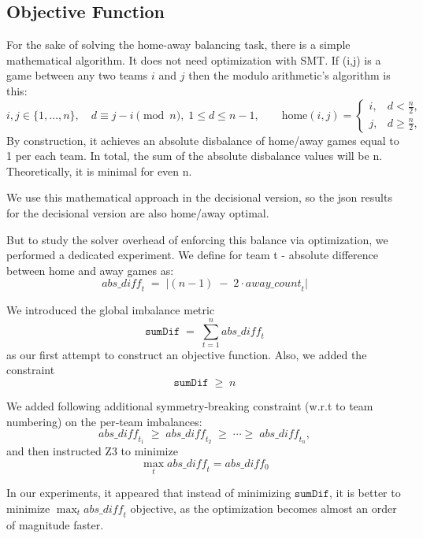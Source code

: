 

\subsection{Objective Function}

For the sake of solving the home-away balancing task, there is a simple mathematical algorithm. It does not need optimization with SMT.
If (i,j) is a game between any two teams $i$ and $j$ then the modulo arithmetic's algorithm is this:
\[
i,j\in\{1,\dots,n\},\quad
d\equiv j-i\pmod n,\;1\le d\le n-1,
\qquad
\text{home}(i,j)=
\begin{cases}
i,&d<\tfrac n2,\\
j,&d\ge\tfrac n2,
\end{cases}
\]
By construction, it achieves an absolute disbalance of home/away games equal to 1 per each team. In total, the sum of the absolute disbalance values will be n.
Theoretically, it is minimal for even n.

We use this mathematical approach in the decisional version, so the json results for the decisional version are also home/away optimal.

But to study the solver overhead of enforcing this balance via optimization, we performed a dedicated experiment. 
We define for team t - absolute difference between home and away games as:
\[
\mathit{abs\_diff}_t \;=\;\bigl\lvert (n-1)\;-\;2\cdot\mathit{away\_count}_t\bigr\rvert
\]

 We introduced the global imbalance metric
\[
\texttt{sumDif} \;=\;\sum_{t=1}^{n}\mathit{abs\_diff}_t
\]
as our first attempt to construct an objective function.  Also, we added the constraint
\[
\texttt{sumDif} \;\ge\; n
\]

We added following additional symmetry‑breaking constraint (w.r.t to team numbering) on the per‑team imbalances:
\[
\mathit{abs\_diff}_{t_1}\;\ge\;\mathit{abs\_diff}_{t_2}\;\ge\;\cdots\ge\;\mathit{abs\_diff}_{t_n},
\]
and then instructed Z3 to minimize
\[
\max_{t}\mathit{abs\_diff}_t = abs\_diff_{0}
\]

In our experiments, it appeared that instead of minimizing $\texttt{sumDif}$, it is better to minimize $\max_{t}\mathit{abs\_diff}_t$ objective, as the optimization becomes almost an order of magnitude faster. 
